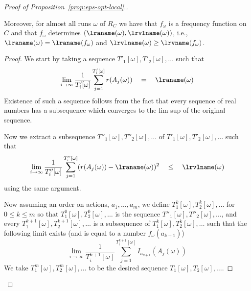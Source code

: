 \begin{proof}[Proof of Proposition~\ref{prop:eps-opt-local}.]
\begin{claim}
Moreover, for almost all runs $\omega$ of $R_C$ we have that $f_{\omega}$ is a frequency function on $C$ and that 
$f_{\omega}$ determines $(\lraname(\omega),\lrvlname(\omega))$, i.e.,
$\lraname(\omega)=\lraname(f_{\omega})$ and $\lrvlname(\omega)\ge\lrvname(f_{\omega})$.
\end{claim}
\begin{proof}
We start by taking a sequence $T'_1[\omega],T'_2[\omega],\ldots$ such that
\[
\lim_{i\rightarrow \infty} \frac{1}{T'_i[\omega]} \sum_{j=1}^{T'_i[\omega]} r(A_j(\omega))\quad = \quad \lraname(\omega)
\]
Existence of such a sequence follows from the fact that every sequence of real numbers has a subsequence which converges to the lim sup of the original sequence.

Now we extract a subsequence $T''_1[\omega],T''_2[\omega],\ldots$ of $T'_1[\omega],T'_2[\omega],\ldots$ such that 
\begin{equation}\label{eq:subsequence-local}
\lim_{i\rightarrow \infty} \frac{1}{T''_i[\omega]} \sum_{j=1}^{T''_i[\omega]} (r(A_j(\omega))-\lraname(\omega))^2\quad \le \quad \lrvlname(\omega)
\end{equation}
using the same argument.

Now assuming an order on actions, $a_1,\ldots,a_m$, we define $T^{k}_1[\omega],T^{k}_2[\omega],\ldots$ for $0\leq k\leq m$ so that $T^{0}_1[\omega],T^{0}_2[\omega],\ldots$ is the sequence $T''_1[\omega],T''_2[\omega],\ldots$, and
every $T^{k+1}_1[\omega],T^{k+1}_2[\omega],\ldots$ is a subsequence of $T^{k}_1[\omega],T^{k}_2[\omega],\ldots$ 
such that the following limit exists (and is equal to a number $f_{\omega}(a_{k+1})$)
\[
\lim_{i\rightarrow \infty} \frac{1}{T^{k+1}_i[\omega]} \sum_{j=1}^{T^{k+1}_i[\omega]} I_{a_{k+1}}(A_j(\omega))
\]
We take $T^{m}_1[\omega],T^{m}_2[\omega],\ldots$ to be the desired sequence $T_1[\omega],T_2[\omega],\ldots$.


\end{proof}
\end{proof}
